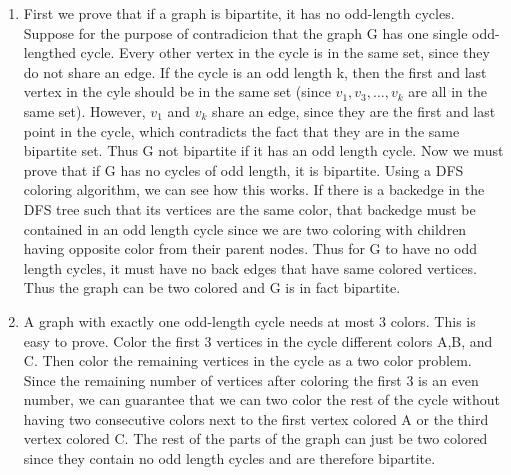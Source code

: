 \documentclass[11pt]{article}
\newenvironment{qparts}{\begin{enumerate}[{(}a{)}]}{\end{enumerate}}
\begin{document}
\begin{qparts}
\begin{enumerate}
\end{enumerate}
\item First we prove that if a graph is bipartite, it has no odd-length cycles. Suppose for the purpose of contradicion that the graph G has one single odd-lengthed cycle. Every other vertex in the cycle is in the same set, since they do not share an edge. If the cycle is an odd length k, then the first and last vertex in the cyle should be in the same set (since $v_1,v_3,...,v_k$ are all in the same set). However, $v_1$ and $v_k$ share an edge, since they are the first and last point in the cycle, which contradicts the fact that they are in the same bipartite set. Thus G not bipartite if it has an odd length cycle.
Now we must prove that if G has no cycles of odd length, it is bipartite. Using a DFS coloring algorithm, we can see how this works. If there is a backedge in the DFS tree such that its vertices are the same color, that backedge must be contained in an odd length cycle since we are two coloring with children having opposite color from their parent nodes. Thus for G to have no odd length cycles, it must have no back edges that have same colored vertices. Thus the graph can be two colored and G is in fact bipartite.
\item A graph with exactly one odd-length cycle needs at most 3 colors. This is easy to prove. Color the first 3 vertices in the cycle different colors A,B, and C. Then color the remaining vertices in the cycle as a two color problem. Since the remaining number of vertices after coloring the first 3 is an even number,  we can guarantee that we can two color the rest of the cycle without having two consecutive colors next to the first vertex colored A or the third vertex colored C. The rest of the parts of the graph can just be two colored since they contain no odd length cycles and are therefore bipartite. 
\end{qparts}
\end{document}
